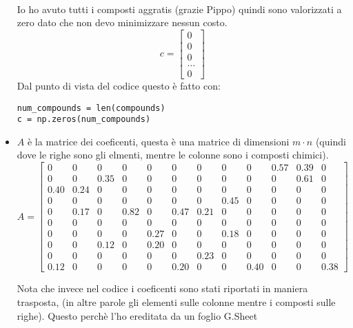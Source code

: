 \documentclass{article}
\begin{document}
\begin{itemize}
    \\Io ho avuto tutti i composti aggratis (grazie Pippo) quindi sono valorizzati a zero dato che non devo minimizzare nessun costo.
        \[c = \begin{bmatrix} 0 \\ 0 \\ 0 \\ \ldots \\ 0 \end{bmatrix}\]
    Dal punto di vista del codice questo è fatto con:
    \begin{lstlisting} 
num_compounds = len(compounds)
c = np.zeros(num_compounds)    
    \end{lstlisting}
    \item $A$ è la matrice dei coeficenti, questa è una matrice di dimensioni $m\cdot n$ (quindi dove le righe sono gli elmenti, mentre le colonne sono i composti chimici).
    \[
    A = \begin{bmatrix}
    0 & 0 & 0 & 0 & 0 & 0 & 0 & 0 & 0 & 0.57 & 0.39 & 0 \\
    0 & 0 & 0.35 & 0 & 0 & 0 & 0 & 0 & 0 & 0 & 0.61 & 0 \\
    0.40 & 0.24 & 0 & 0 & 0 & 0 & 0 & 0 & 0 & 0 & 0 & 0 \\
    0 & 0 & 0 & 0 & 0 & 0 & 0 & 0.45 & 0 & 0 & 0 & 0 \\
    0 & 0.17 & 0 & 0.82 & 0 & 0.47 & 0.21 & 0 & 0 & 0 & 0 & 0 \\
    0 & 0 & 0 & 0 & 0 & 0 & 0 & 0 & 0 & 0 & 0 & 0 \\
    0 & 0 & 0 & 0 & 0.27 & 0 & 0 & 0.18 & 0 & 0 & 0 & 0 \\
    0 & 0 & 0.12 & 0 & 0.20 & 0 & 0 & 0 & 0 & 0 & 0 & 0 \\
    0 & 0 & 0 & 0 & 0 & 0 & 0.23 & 0 & 0 & 0 & 0 & 0 \\
    0.12 & 0 & 0 & 0 & 0 & 0.20 & 0 & 0 & 0.40 & 0 & 0 & 0.38
    \end{bmatrix}        
    \]

Nota che invece nel codice i coeficenti sono stati riportati in maniera trasposta, (in altre parole gli elementi sulle colonne mentre i composti sulle righe). Questo perchè l'ho ereditata da un foglio G.Sheet 


\end{itemize}
\end{document}
